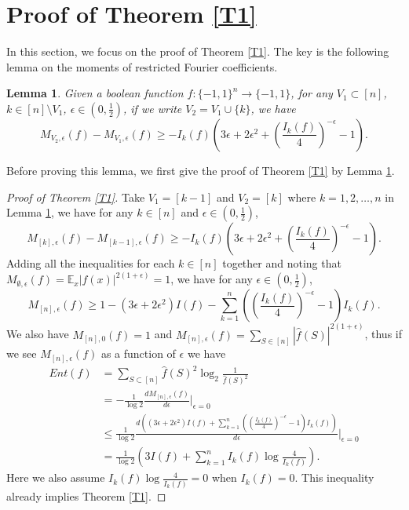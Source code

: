 \documentclass[10pt]{article} \usepackage[utf8]{inputenc}
\newtheorem{lem}{Lemma}[section]
\theoremstyle{definition}
\theoremstyle{remark}
\numberwithin{equation}{section}
\begin{document}
\section{Proof of Theorem \ref{T1}}
In this section, we focus on the proof of Theorem \ref{T1}. The key is the following lemma on the moments of restricted Fourier coefficients.
\begin{lem}
\label{L31}
Given a boolean function $f:\{-1,1\}^n \to \{-1,1\}$, for any $V_1 \subset [n]$, $k \in [n]\setminus V_1$, $\epsilon \in (0, \frac{1}{2})$, if we write $V_2=V_1 \cup \{k\}$, we have
\begin{equation}
M_{V_2,\epsilon}(f)-M_{V_1,\epsilon}(f) \geq -I_k(f)(3\epsilon +2\epsilon^2+ (\frac{I_k(f)}{4})^{-\epsilon}-1).
\end{equation}
\end{lem}
Before proving this lemma, we first give the proof of Theorem \ref{T1} by Lemma \ref{L31}.
\begin{proof}[Proof of Theorem \ref{T1}]
Take $V_1=[k-1]$ and $V_2=[k]$ where $k=1,2,\dots,n$ in Lemma \ref{L31}, we have for any $k\in[n]$ and $\epsilon \in (0,\frac{1}{2})$,
\begin{equation}
M_{[k],\epsilon}(f)-M_{[k-1],\epsilon}(f) \geq -I_k(f)(3\epsilon +2\epsilon^2+ (\frac{I_k(f)}{4})^{-\epsilon}-1).
\end{equation}
Adding all the inequalities for each $k\in [n]$ together and noting that $M_{\emptyset,\epsilon}(f)=\mathbb{E}_x |f(x)|^{2(1+\epsilon)}=1$, we have for any $\epsilon \in (0,\frac{1}{2})$,
\begin{equation}
M_{[n],\epsilon}(f) \geq 1-(3\epsilon +2\epsilon^2)I(f)- \sum_{k=1}^n ((\frac{I_k(f)}{4})^{-\epsilon}-1)I_k(f).
\end{equation}
We also have $M_{[n], 0}(f)=1$ and $M_{[n],\epsilon}(f)=\sum\limits_{S\in[n]} |\hat{f}(S)|^{2(1+\epsilon)}$, thus if we see $M_{[n],\epsilon}(f)$ as a function of $\epsilon$ we have
\begin{equation}
\begin{aligned}
Ent(f) &= \sum_{S\subset [n]} \hat{f}(S)^2 \log_2 \frac{1}{\hat{f}(S)^2} \\
&= -\frac{1}{\log2} \frac{dM_{[n],\epsilon}(f)}{d\epsilon}\big|_{\epsilon=0} \\
&\leq \frac{1}{\log2}\frac{d((3\epsilon +2\epsilon^2)I(f)+ \sum_{k=1}^n ((\frac{I_k(f)}{4})^{-\epsilon}-1)I_k(f))}{d\epsilon}\big|_{\epsilon=0}\\
&= \frac{1}{\log2}(3I(f)+\sum_{k=1}^n{I_k(f) \log\frac{4}{I_k(f)}}).
\end{aligned}
\end{equation}
Here we also assume $I_k(f) \log\frac{4}{I_k(f)}=0$ when $I_k(f)=0$. This inequality already implies Theorem \ref{T1}.
\end{proof}
\end{document}
